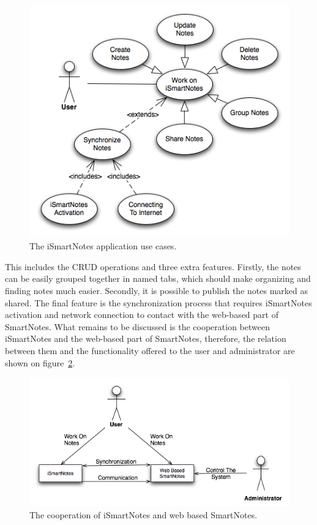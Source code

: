 \begin{figure}[ht]
\begin{center}
\includegraphics[scale=0.55]{charts/work_on_iSmartNotes.png}
\caption{The iSmartNotes application use cases.}
\label{fig:workon_ismartnotes}
\end{center}
\end{figure}
This includes the CRUD operations and three extra features. Firstly, the notes can be easily grouped together in named tabs, which should make organizing and finding notes much easier. Secondly, it is possible to publish the notes marked as shared. The final feature is the synchronization process that requires iSmartNotes activation and network connection to contact with the web-based part of SmartNotes. What remains to be discussed is the cooperation between iSmartNotes and the web-based part of SmartNotes, therefore, the relation between them and the functionality offered to the user and administrator are shown on figure~\ref{fig:ismartnotes_smartnotes}. 
\begin{figure}[ht]
\begin{center}
\includegraphics[scale=0.55]{charts/iSmartNotes_SmartNotes.png}
\caption{The cooperation of iSmartNotes and web based SmartNotes.}
\label{fig:ismartnotes_smartnotes}
\end{center}
\end{figure}


